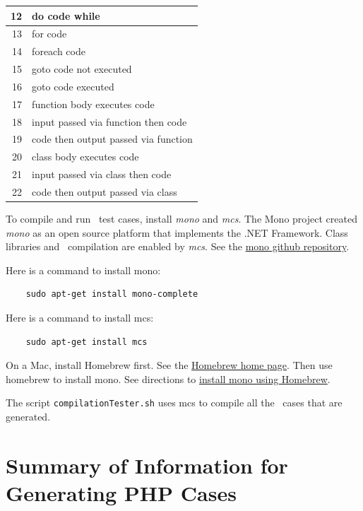 \begin{appendices}
\begin{table}[H]
\begin{tabular}{|r|l|}
12 & do code while \\
\hline
13 & for code \\
\hline
14 & foreach code \\
\hline
15 & goto code not executed \\
\hline
16 & goto code executed \\
\hline
17 & function body executes code \\
\hline
18 & input passed via function then code \\
\hline
19 & code then output passed via function \\
\hline
20 & class body executes code \\
\hline
21 & input passed via class then code \\
\hline
22 & code then output passed via class \\
\hline
\end{tabular}
\label{tab:complexity IDs for CSharp}
\end{table}

\label{sec:run csharp}
To compile and run \CSharp\ test cases, install \emph{mono} and \emph{mcs}.
The Mono project created \emph{mono} as an open source platform that
implements the .NET Framework. Class libraries and \CSharp\ compilation are enabled
by \emph{mcs}. See the \href{http://github.com/mono/mono}{mono github repository}.

Here is a command to install mono:

\begin{verbatim}
    sudo apt-get install mono-complete
\end{verbatim}

Here is a command to install mcs:

\begin{verbatim}
    sudo apt-get install mcs
\end{verbatim}

On a Mac, install Homebrew first. See
the \href{https://brew.sh/}{Homebrew home page}.
Then use homebrew to install mono.  See directions to
\href{https://formulae.brew.sh/formula/mono}{install mono using Homebrew}.

The script \verb|compilationTester.sh| uses mcs to compile all the
\CSharp\ cases that are generated.


\section{Summary of Information for Generating PHP Cases}
\label{sec:PHP language}


\end{appendices}
